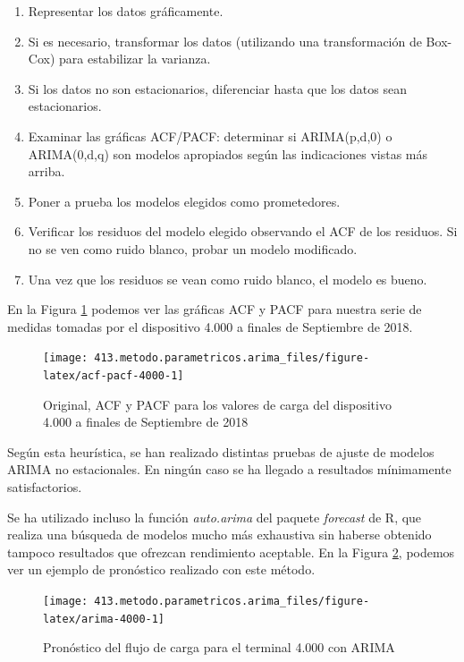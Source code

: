 \documentclass[]{book}
\providecommand{\tightlist}{%
  \setlength{\itemsep}{0pt}\setlength{\parskip}{0pt}}
\begin{document}
\begin{enumerate}
\def\labelenumi{\arabic{enumi}.}
\tightlist
\item
  Representar los datos gráficamente.
\item
  Si es necesario, transformar los datos (utilizando una transformación
  de Box-Cox) para estabilizar la varianza.
\item
  Si los datos no son estacionarios, diferenciar hasta que los datos
  sean estacionarios.
\item
  Examinar las gráficas ACF/PACF: determinar si ARIMA(p,d,0) o
  ARIMA(0,d,q) son modelos apropiados según las indicaciones vistas más
  arriba.
\item
  Poner a prueba los modelos elegidos como prometedores.
\item
  Verificar los residuos del modelo elegido observando el ACF de los
  residuos. Si no se ven como ruido blanco, probar un modelo modificado.
\item
  Una vez que los residuos se vean como ruido blanco, el modelo es
  bueno.
\end{enumerate}

En la Figura \ref{fig:acf-pacf-4000} podemos ver las gráficas ACF y PACF
para nuestra serie de medidas tomadas por el dispositivo 4.000 a finales
de Septiembre de 2018.

\begin{figure}

{\centering \texttt{[image: 413.metodo.parametricos.arima\_files/figure-latex/acf-pacf-4000-1]} 

}

\caption{Original, ACF y PACF para los valores de carga del dispositivo 4.000 a finales de Septiembre de 2018}\label{fig:acf-pacf-4000}
\end{figure}

Según esta heurística, se han realizado distintas pruebas de ajuste de
modelos ARIMA no estacionales. En ningún caso se ha llegado a resultados
mínimamente satisfactorios.

Se ha utilizado incluso la función \emph{auto.arima} del paquete
\emph{forecast} de R, que realiza una búsqueda de modelos mucho más
exhaustiva sin haberse obtenido tampoco resultados que ofrezcan
rendimiento aceptable. En la Figura \ref{fig:arima-4000}, podemos ver un
ejemplo de pronóstico realizado con este método.

\begin{figure}

{\centering \texttt{[image: 413.metodo.parametricos.arima\_files/figure-latex/arima-4000-1]} 

}

\caption{Pronóstico del flujo de carga para el terminal 4.000 con ARIMA}\label{fig:arima-4000}
\end{figure}
\end{document}
